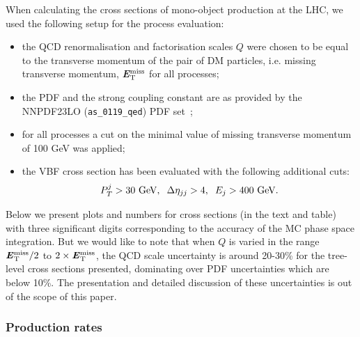 \documentclass[12pt,a4paper]{article}
\newcommand{\MET}{\textbf{\textit{E}$_{\rm T}^{\rm miss}$}}
\begin{document}
When calculating the cross sections of mono-object production at the LHC,
we used the following setup for the process evaluation:
\begin{itemize}
\item the QCD renormalisation and factorisation scales $Q$ were chosen to be equal to the
transverse momentum of the pair of DM particles,  i.e. missing transverse momentum, \MET{}
for all processes;
\item the PDF and the strong coupling constant are as provided by the
NNPDF23LO (\verb|as_0119_qed|) PDF set~\cite{Ball:2012cx};
\item for all processes a cut on the minimal value of missing transverse momentum of 100 GeV 
was applied;
\item the VBF cross section has been evaluated with the following additional cuts:
  \begin{align}
    P_T^j>30\mbox{ GeV}, \hspace{2mm} \Delta\eta_{jj}>4, \hspace{2mm} E_j> 400\mbox{ GeV}.
  \end{align}
  \end{itemize}
Below we present plots and numbers for cross sections (in the text and table)
with three significant digits corresponding to the accuracy of the MC phase space integration.
But we would like to note that when $Q$ is varied in the range $\MET/2$ to $2\times \MET$,
the QCD scale uncertainty is around 20-30\% for the tree-level cross sections presented,
dominating over PDF uncertainties which are below 10\%.
The presentation and detailed discussion of
these uncertainties is out of the scope of this paper.


\subsubsection{Production rates}
\end{document}
